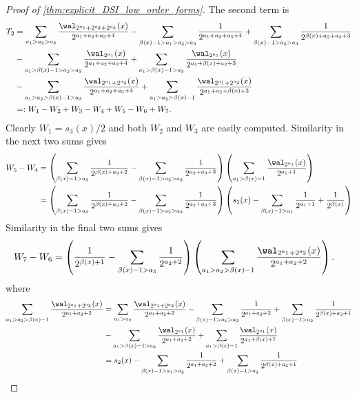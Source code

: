\documentclass[acmsmall]{acmart}
\begin{document}
\begin{proof}[Proof of \cref{thm:explicit_DSI_low_order_forms}]
    The second term is 
    \begin{align*}
        T_2 &= \sum_{a_1>a_2>a_3} \frac{\wal_{2^{a_1}+2^{a_2}+2^{a_3}}(x)}{2^{a_1+a_2+a_3+4}} - \sum_{\beta(x)-1 > a_1 > a_2 > a_3} \frac{1}{2^{a_1+a_2+a_3+4}} + \sum_{\beta(x)-1 > a_2 > a_3} \frac{1}{2^{\beta(x)+a_2+a_3+3}} \\ & - \sum_{a_1 > \beta(x)-1 > a_2 > a_3} \frac{\wal_{2^{a_1}}(x)}{2^{a_1+a_2+a_3+4}} + \sum_{a_1 > \beta(x)-1 > a_3}  \frac{\wal_{2^{a_1}}(x)}{2^{a_1+\beta(x)+a_3+3}} \\ &- \sum_{a_1 > a_2 > \beta(x)-1 > a_3}\frac{\wal_{2^{a_1}+2^{a_2}}(x)}{2^{a_1+a_2+a_3+4}} + \sum_{a_1 > a_2 > \beta(x)-1} \frac{\wal_{2^{a_1}+2^{a_2}}(x)}{2^{a_1+a_2+\beta(x)+3}} \\
        &=: W_1-W_2+W_3-W_4+W_5-W_6+W_7.
    \end{align*}
    Clearly $W_1 = s_3(x)/2$ and both $W_2$ and $W_3$ are easily computed. Similarity in the next two sums gives
    \begin{align*}
        W_5 - W_4 &= \left(\sum_{\beta(x)-1 > a_3}\frac{1}{2^{\beta(x)+a_3+2}}-\sum_{\beta(x)-1>a_2>a_3} \frac{1}{2^{a_2+a_3+3}}\right) \left(\sum_{a_1 > \beta(x)-1} \frac{\wal_{2^{a_1}}(x)}{2^{a_1+1}} \right) \\
        &= \left(\sum_{\beta(x)-1 > a_3}\frac{1}{2^{\beta(x)+a_3+2}}-\sum_{\beta(x)-1>a_2>a_3} \frac{1}{2^{a_2+a_3+3}}\right)\left(s_1(x) - \sum_{\beta(x)-1 > a_1} \frac{1}{2^{a_1+1}} + \frac{1}{2^{\beta(x)}}\right)
    \end{align*}
    Similarity in the final two sums gives  
    \begin{align*}
        W_7 - W_6 &= \left(\frac{1}{2^{\beta(x)+1}}-\sum_{\beta(x)-1 > a_3} \frac{1}{2^{a_3+2}}\right) \left(\sum_{a_1>a_2 > \beta(x)-1} \frac{\wal_{2^{a_1}+2^{a_2}}(x)}{2^{a_1+a_2+2}}\right).
    \end{align*}
    where 
    \begin{align*}
        \sum_{a_1>a_2 > \beta(x)-1} \frac{\wal_{2^{a_1}+2^{a_2}}(x)}{2^{a_1+a_2+2}} &= \sum_{a_1>a_2} \frac{\wal_{2^{a_1}+2^{a_2}}(x)}{2^{a_1+a_2+2}} - \sum_{\beta(x)-1 > a_1 > a_2} \frac{1}{2^{a_1+a_2+2}} + \sum_{\beta(x)-1 > a_2} \frac{1}{2^{\beta(x)+a_2+1}} \\ &- \sum_{a_1 > \beta(x)-1 > a_2} \frac{\wal_{2^{a_1}}(x)}{2^{a_1+a_2+2}} + \sum_{a_1 > \beta(x)-1} \frac{\wal_{2^{a_1}}(x)}{2^{a_1+\beta(x)+1}} \\
        &= s_2(x) - \sum_{\beta(x)-1 > a_1 > a_2} \frac{1}{2^{a_1+a_2+2}} + \sum_{\beta(x)-1 > a_2} \frac{1}{2^{\beta(x)+a_2+1}}\\

\end{align*}
\end{proof}
\end{document}
